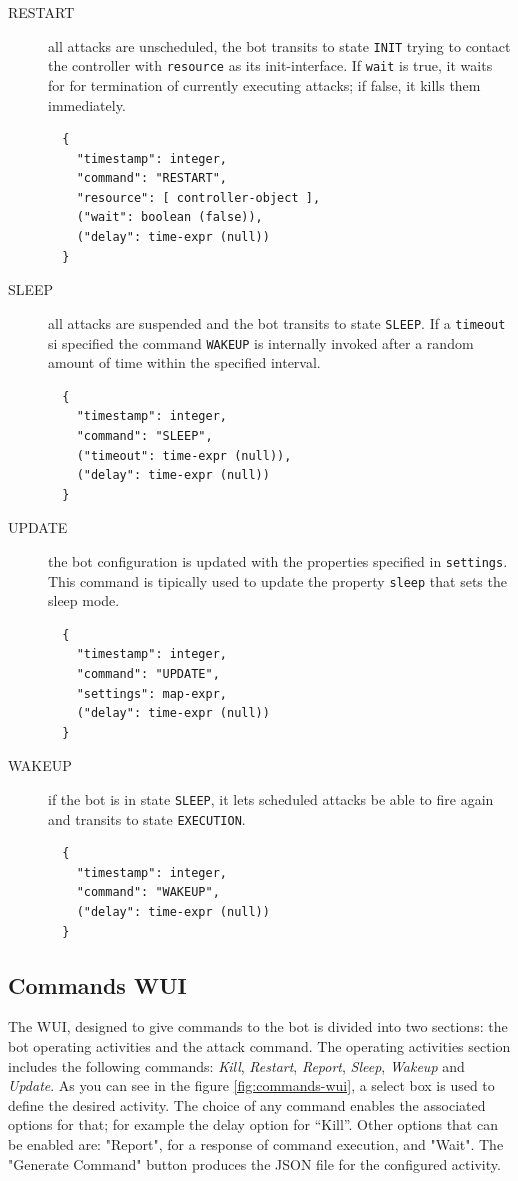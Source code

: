 \begin{description}
  \item[RESTART] all attacks are unscheduled, the bot transits to state \texttt{INIT} trying to contact the controller with \texttt{resource} as its init-interface.
  If \texttt{wait} is true, it waits for for termination of currently executing attacks; if false, it kills them immediately.

  \begin{verbatim}
  {
    "timestamp": integer,
    "command": "RESTART",
    "resource": [ controller-object ],
    ("wait": boolean (false)),
    ("delay": time-expr (null))
  }
  \end{verbatim}

  \item[SLEEP] all attacks are suspended and the bot transits to state \texttt{SLEEP}. If a \texttt{timeout} si specified the command \texttt{WAKEUP} is internally invoked after a random amount of time within the specified interval.

  \begin{verbatim}
  {
    "timestamp": integer,
    "command": "SLEEP",
    ("timeout": time-expr (null)),
    ("delay": time-expr (null))
  }
  \end{verbatim}

  \item[UPDATE] the bot configuration is updated with the properties specified in \texttt{settings}. This command is tipically used to update the property \texttt{sleep} that sets the sleep mode.

  \begin{verbatim}
  {
    "timestamp": integer,
    "command": "UPDATE",
    "settings": map-expr,
    ("delay": time-expr (null))
  }
  \end{verbatim}

  \item[WAKEUP] if the bot is in state \texttt{SLEEP}, it lets scheduled attacks be able to fire again and transits to state \texttt{EXECUTION}.

  \begin{verbatim}
  {
    "timestamp": integer,
    "command": "WAKEUP",
    ("delay": time-expr (null))
  }
  \end{verbatim}

\end{description}

\subsection{Commands WUI}\label{sec:commands-wui}
The WUI, designed to give commands to the bot is divided into two sections: the bot operating activities and the attack command. The operating activities section includes the following commands: \textit{Kill}, \textit{Restart}, \textit{Report}, \textit{Sleep}, \textit{Wakeup} and \textit{Update}. As you can see in the figure \ref{fig:commands-wui}, a select box is used to define the desired activity. The choice of any command enables the associated options for that; for example the delay option for “Kill”. Other options that can be enabled are: "Report", for a response of command execution, and "Wait". The "Generate Command" button produces the JSON file for the configured activity.

